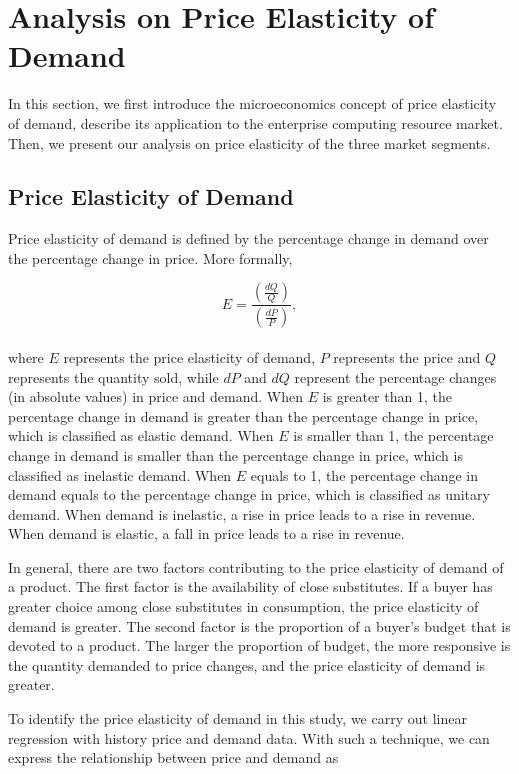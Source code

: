 \documentclass[10pt,journal,cspaper,compsoc]{IEEEtran}
\begin{document}
\section{Analysis on Price Elasticity of Demand}
\label{sec:analysis}
In this section, we first introduce the microeconomics concept of price elasticity of demand, describe its application to the enterprise computing resource market. Then, we present our analysis on price elasticity of the three market segments.

\subsection{Price Elasticity of Demand}

Price elasticity of demand is defined by the percentage change in demand over the percentage change in price. More formally,

\begin{equation}
E = \frac{\left ( \frac{dQ}{Q} \right )}{\left ( \frac{dP}{P} \right )} ,
\end{equation}
\\where $E$ represents the price elasticity of demand, $P$ represents the price and $Q$ represents the quantity sold, while $dP$ and $dQ$ represent the percentage changes (in absolute values) in price and demand. When $E$ is greater than 1, the percentage change in demand is greater than the percentage change in price, which is classified as elastic demand. When $E$ is smaller than 1, the percentage change in demand is smaller than the percentage change in price, which is classified as inelastic demand. When $E$ equals to 1, the percentage change in demand equals to the percentage change in price, which is classified as unitary demand. When demand is inelastic, a rise in price leads to a rise in revenue. When demand is elastic, a fall in price leads to a rise in revenue. 

In general, there are two factors contributing to the price elasticity of demand of a product. The first factor is the availability of close substitutes. If a buyer has greater choice among close substitutes in consumption, the price elasticity of demand is greater. The second factor is the proportion of a buyer's budget that is devoted to a product. The larger the proportion of budget, the more responsive is the quantity demanded to price changes, and the price elasticity of demand is greater.

To identify the price elasticity of demand in this study, we carry out linear regression with history price and demand data. With such a technique, we can express the relationship between price and demand as
\end{document}
